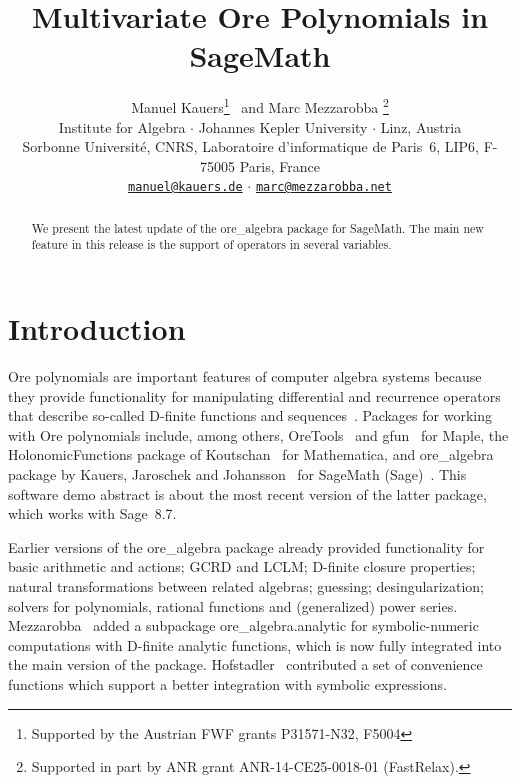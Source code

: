 \documentclass[11pt]{article}
\date{}
\begin{document}
\title{Multivariate Ore Polynomials in SageMath}

\author{%
  Manuel Kauers\footnote{Supported by the Austrian FWF grants P31571-N32, F5004} \
  and Marc Mezzarobba%
  \footnote{Supported in part by ANR grant ANR-14-CE25-0018-01 (FastRelax).}%
  \\[\medskipamount]
  Institute for Algebra $\cdot$ Johannes Kepler University $\cdot$ Linz, Austria\\
  Sorbonne Université, CNRS, Laboratoire d'informatique de Paris~6, LIP6,
  F-75005 Paris, France\\[\medskipamount]
  \href{mailto:manuel@kauers.de}{\nolinkurl{manuel@kauers.de}} $\cdot$
  \href{mailto:marc@mezzarobba.net}{\nolinkurl{marc@mezzarobba.net}}
}

\maketitle

\begin{abstract}
  We present the latest update of the ore\_algebra package for SageMath.
  The main new feature in this release is the support of operators in several variables.
\end{abstract}

\section{Introduction}

Ore polynomials are important features of computer algebra systems because they provide
functionality for manipulating differential and recurrence operators that describe
so-called D-finite functions and sequences~\cite{stanley80,kauers10j,kauers13}.
Packages for working with Ore polynomials include, among others,
OreTools~\cite{abramov03} and gfun~\cite{salvy94} for Maple,
the HolonomicFunctions package of Koutschan~\cite{koutschan10c} for Mathematica,
and ore\_algebra package by Kauers, Jaroschek and Johansson~\cite{kauers14b} for
SageMath (Sage)~\cite{zimmermann18}. This software demo abstract is about the most recent version of the
latter package, which works with Sage~8.7.

Earlier versions of the ore\_algebra package already provided functionality for basic arithmetic
and actions; GCRD and LCLM; D-finite closure properties; natural transformations between related
algebras; guessing; desingularization; solvers for polynomials, rational functions and (generalized)
power series. Mezzarobba~\cite{mezzarobba16} added a subpackage ore\_algebra.analytic for symbolic-numeric
computations with D-finite analytic functions, which is now fully integrated into the main version of the package.
Hofstadler~\cite{hofstadler19} contributed a set of convenience functions which support a better integration
with symbolic expressions.
\end{document}
